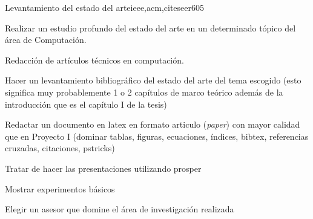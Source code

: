 \begin{syllabus}
\begin{unit}{Levantamiento del estado del arte}{ieee,acm,citeseer}{60}{5}
  \begin{topics}
      \item Realizar un estudio profundo del estado del arte en un determinado tópico del área de Computación.
      \item Redacción de artículos técnicos en computación.
  \end{topics}
  \begin{unitgoals}
      \item Hacer un levantamiento bibliográfico del estado del arte del tema escogido (esto significa muy probablemente 1 o 2 capítulos de marco teórico además de la introducción que es el capítulo I de la tesis)
      \item Redactar un documento en latex en formato articulo (\emph{paper}) con mayor calidad que en Proyecto I (dominar tablas, figuras, ecuaciones, índices, bibtex, referencias cruzadas, citaciones, pstricks)
      \item Tratar de hacer las presentaciones utilizando prosper
      \item Mostrar experimentos básicos
      \item Elegir un asesor que domine el área de investigación realizada
   \end{unitgoals}
\end{unit}



\begin{coursebibliography}

\end{coursebibliography}
\end{syllabus}
